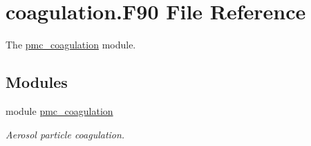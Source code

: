 \hypertarget{coagulation_8_f90}{}\section{coagulation.\+F90 File Reference}
\label{coagulation_8_f90}


The \mbox{\hyperlink{namespacepmc__coagulation}{pmc\+\_\+coagulation}} module.  


\subsection*{Modules}
\begin{DoxyCompactItemize}
\item 
module \mbox{\hyperlink{namespacepmc__coagulation}{pmc\+\_\+coagulation}}
\begin{DoxyCompactList}\small\item\em Aerosol particle coagulation. \end{DoxyCompactList}\end{DoxyCompactItemize}
